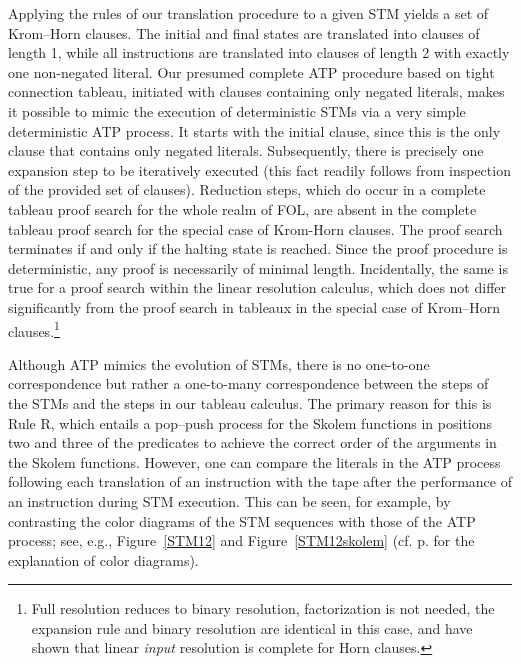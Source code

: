 \documentclass[%
  manuscript=article,   %
  year=2024,
  volume=77,
  doi=10.59203/zfn.77.694,
]{zfn}
\begin{document}
Applying the rules of our translation procedure to a given STM yields a set of Krom--Horn clauses. The initial and final states are translated into clauses of length 1, while all instructions are translated into clauses of length 2 with exactly one non-negated literal. Our presumed complete ATP procedure based on tight connection tableau, initiated with clauses containing only negated literals, makes it possible to mimic the execution of deterministic STMs via a very simple deterministic ATP process. It starts with the initial clause, since this is the only clause that contains only negated literals. Subsequently, there is precisely one expansion step to be iteratively executed (this fact readily follows from inspection of the provided set of clauses).
Reduction steps, which do occur in a complete tableau proof search for the whole realm of FOL, are absent in the complete tableau proof search for the special case of Krom-Horn clauses.
The proof search terminates if and only if the halting state is reached. Since the proof procedure is deterministic, any proof is necessarily of minimal length. Incidentally, the same is true for a proof search within the linear resolution calculus, which does not differ significantly from the proof search in tableaux in the special case of Krom--Horn clauses.\footnote{Full resolution reduces to binary resolution, factorization is not needed, the expansion rule and binary resolution are identical in this case, and \parencite{Henschen} have shown that linear \emph{input} \label{resolu} resolution is complete for Horn clauses.}

Although ATP mimics the evolution of STMs, there is no one-to-one correspondence but rather a one-to-many correspondence between the steps of the STMs and the steps in our tableau calculus. The primary reason for this is Rule R, which entails a pop--push process for the Skolem functions in positions two and three of the predicates to achieve the correct order of the arguments in the Skolem functions.
However, one can compare the literals in the ATP process following each translation of an instruction with the tape after the performance of an instruction during STM execution. This can be seen, for example, by contrasting the color diagrams of the STM sequences with those of the ATP process; see, e.g.,
Figure~\ref{STM12} and Figure~\ref{STM12skolem} (cf. p. \pageref{colordia} for the explanation of color diagrams).
\end{document}
